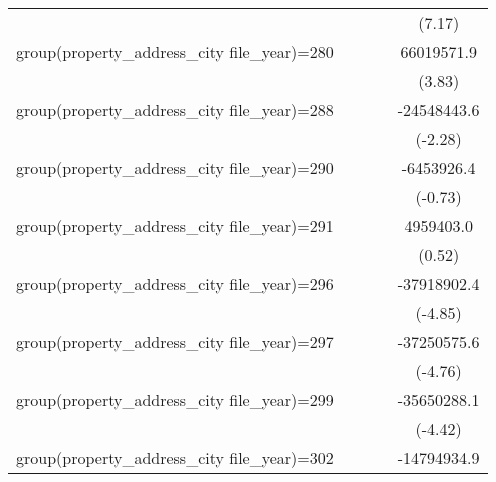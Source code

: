{\begin{tabular}{l*{4}{c}}
                    &                     &                     &                     &      (7.17)         \\
\addlinespace
group(property\_address\_city file\_year)=280&                     &                     &                     &  66019571.9\sym{***}\\
                    &                     &                     &                     &      (3.83)         \\
\addlinespace
group(property\_address\_city file\_year)=288&                     &                     &                     & -24548443.6\sym{*}  \\
                    &                     &                     &                     &     (-2.28)         \\
\addlinespace
group(property\_address\_city file\_year)=290&                     &                     &                     &  -6453926.4         \\
                    &                     &                     &                     &     (-0.73)         \\
\addlinespace
group(property\_address\_city file\_year)=291&                     &                     &                     &   4959403.0         \\
                    &                     &                     &                     &      (0.52)         \\
\addlinespace
group(property\_address\_city file\_year)=296&                     &                     &                     & -37918902.4\sym{***}\\
                    &                     &                     &                     &     (-4.85)         \\
\addlinespace
group(property\_address\_city file\_year)=297&                     &                     &                     & -37250575.6\sym{***}\\
                    &                     &                     &                     &     (-4.76)         \\
\addlinespace
group(property\_address\_city file\_year)=299&                     &                     &                     & -35650288.1\sym{***}\\
                    &                     &                     &                     &     (-4.42)         \\
\addlinespace
group(property\_address\_city file\_year)=302&                     &                     &                     & -14794934.9         \\

\end{tabular}}
